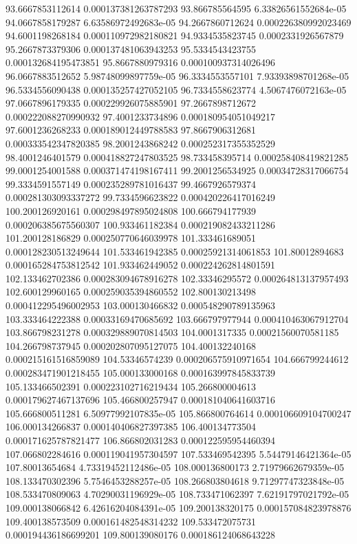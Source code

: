 {93.6667853112614 0.000137381263787293
93.866785564595 6.33826561552684e-05
94.0667858179287 6.63586972492683e-05
94.2667860712624 0.000226380992023469
94.6001198268184 0.000110972982180821
94.9334535823745 0.0002331926567879
95.2667873379306 0.000137481063943253
95.5334543423755 0.000132684195473851
95.8667880979316 0.000100937314026496
96.0667883512652 5.98748099897759e-05
96.3334553557101 7.93393898701268e-05
96.5334556090438 0.000135257427052105
96.7334558623774 4.5067476072163e-05
97.0667896179335 0.000229926075885901
97.2667898712672 0.000222088270990932
97.4001233734896 0.000180954051049217
97.6001236268233 0.000189012449788583
97.8667906312681 0.000333542347820385
98.2001243868242 0.000252317355352529
98.4001246401579 0.000418827247803525
98.733458395714 0.000258408419821285
99.0001254001588 0.000371474198167411
99.2001256534925 0.00034728317066754
99.3334591557149 0.000235289781016437
99.4667926579374 0.000281303093337272
99.7334596623822 0.000420226417016249
100.200126920161 0.000298497895024808
100.666794177939 0.000206385675560307
100.933461182384 0.000219082433211286
101.200128186829 0.000250770646039978
101.333461689051 0.000128230513249644
101.533461942385 0.00025921314061853
101.80012894683 0.000165284753812542
101.933462449052 0.000224262814801591
102.133462702386 0.000283094678916278
102.33346295572 0.000264813137957493
102.600129960165 0.000259035394860552
102.800130213498 0.000412295496002953
103.000130466832 0.000548290789135963
103.333464222388 0.00033169470685692
103.666797977944 0.000410463067912704
103.866798231278 0.000329889070814503
104.0001317335 0.00021560070581185
104.266798737945 0.000202807095127075
104.400132240168 0.000215161516859089
104.53346574239 0.000206575910971654
104.666799244612 0.000283471901218455
105.000133000168 0.000163997845833739
105.133466502391 0.000223102716219434
105.266800004613 0.000179627467137696
105.466800257947 0.000181040641603716
105.666800511281 6.50977992107835e-05
105.866800764614 0.000106609104700247
106.000134266837 0.000140406827397385
106.400134773504 0.000171625787821477
106.866802031283 0.000122595954460394
107.066802284616 0.000119041957304597
107.533469542395 5.54479146421364e-05
107.80013654684 4.73319452112486e-05
108.000136800173 2.71979662679359e-05
108.133470302396 5.7546453288257e-05
108.266803804618 9.71297747323848e-05
108.533470809063 4.70290031196929e-05
108.733471062397 7.62191797021792e-05
109.000138066842 6.42616204084391e-05
109.200138320175 0.000157084823978876
109.400138573509 0.000161482548314232
109.533472075731 0.000194436186699201
109.800139080176 0.000186124068643228
}
